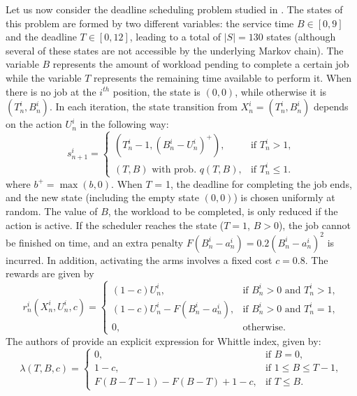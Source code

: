 \documentclass[12pt]{article}
\numberwithin{equation}{section}
\newcommand{\1}{\textbf{1}}
\begin{document}
Let us now consider the deadline scheduling problem studied in \cite{Yu}. The states of this
problem are formed by two different variables: the service time $B \in [0, 9]$ and
the deadline $T \in [0, 12]$, leading to a total of $|S| = 130$ states (although several 
of these states are not accessible by the underlying Markov chain). The variable $B$ 
represents the amount of workload pending to complete a certain job while
the variable $T$ represents the remaining time available to perform it. When there is 
no job at the $i^{th}$ position, the state is $(0, 0)$, while otherwise it is 
$(T_n^i, B_n^i)$. In each iteration, the state transition from $X_n^i=(T_n^i, B_n^i)$ 
depends on the action $U_n^i$ in the following way:
\begin{equation}
s_{n+1}^i =
\begin{cases} 
(T_n^i - 1, (B_n^i - U_n^i)^+), & \text{if } T_n^i > 1, \\
(T, B) \text{ with prob. } q(T, B), & \text{if } T_n^i \leq 1.
\end{cases}
\end{equation}
where $b^+ = \max(b, 0)$. When $T$ = 1, the deadline for completing the job ends, 
and the new state (including the empty state $(0, 0)$) is chosen uniformly at random. 
The value of $B$, the workload to be completed, is only reduced if the action
is active. If the scheduler reaches the state ($T = 1$, $B > 0$), the job cannot 
be finished on time, and an extra penalty
$F(B_n^i-a_n^i)=0.2(B_n^i-a_n^i)^2$ is incurred. In addition, activating the arms 
involves a fixed cost $c = 0.8$. The rewards are given by
\begin{equation}
r_{n}^i(X_{n}^i, U_{n}^i, c) =
\begin{cases}
(1 - c)U_{n}^i, & \text{if } B_n^i > 0 \text{ and } T_n^i > 1, \\
(1 - c)U_{n}^i - F(B_n^i - a_n^i), & \text{if } B_n^i > 0 \text{ and } T_n^i = 1, \\
0, & \text{otherwise.}
\end{cases}
\end{equation}
The authors of \cite{Yu} provide an explicit expression for Whittle index, given by:
\begin{equation}
\lambda(T, B, c) =
\begin{cases}
0, & \text{if } B = 0, \\
1 - c, & \text{if } 1 \leq B \leq T - 1, \\
F(B - T - 1) - F(B - T) + 1 - c, & \text{if } T \leq B.
\end{cases}
\end{equation}
\end{document}
